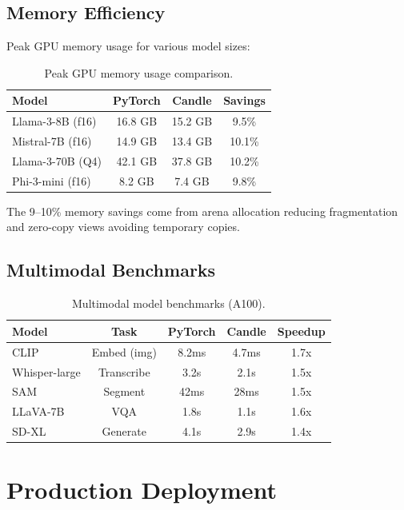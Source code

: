 \documentclass[11pt,twocolumn]{article}
\begin{document}
\subsection{Memory Efficiency}

Peak GPU memory usage for various model sizes:

\begin{table}[H]
\centering
\small
\begin{tabular}{lccc}
\toprule
\textbf{Model} & \textbf{PyTorch} & \textbf{Candle} & \textbf{Savings} \\
\midrule
Llama-3-8B (f16) & 16.8 GB & 15.2 GB & 9.5\% \\
Mistral-7B (f16) & 14.9 GB & 13.4 GB & 10.1\% \\
Llama-3-70B (Q4) & 42.1 GB & 37.8 GB & 10.2\% \\
Phi-3-mini (f16) & 8.2 GB & 7.4 GB & 9.8\% \\
\bottomrule
\end{tabular}
\caption{Peak GPU memory usage comparison.}
\label{tab:memory}
\end{table}

The 9--10\% memory savings come from arena allocation reducing fragmentation and zero-copy views avoiding temporary copies.

\subsection{Multimodal Benchmarks}

\begin{table}[H]
\centering
\small
\begin{tabular}{lcccc}
\toprule
\textbf{Model} & \textbf{Task} & \textbf{PyTorch} & \textbf{Candle} & \textbf{Speedup} \\
\midrule
CLIP & Embed (img) & 8.2ms & 4.7ms & 1.7x \\
Whisper-large & Transcribe & 3.2s & 2.1s & 1.5x \\
SAM & Segment & 42ms & 28ms & 1.5x \\
LLaVA-7B & VQA & 1.8s & 1.1s & 1.6x \\
SD-XL & Generate & 4.1s & 2.9s & 1.4x \\
\bottomrule
\end{tabular}
\caption{Multimodal model benchmarks (A100).}
\label{tab:multimodal}
\end{table}

\section{Production Deployment}
\label{sec:production}
\end{document}
